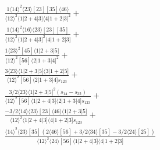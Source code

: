 \documentclass[varwidth, border=5pt]{standalone}
\begin{document}
\begin{my}
$\begin{gathered}
\scriptscriptstyle\frac{1⟨14⟩^2⟨23⟩[23][35]⟨46⟩}{⟨12⟩^2⟨1|2+4|3]⟨4|1+2|3]^2}+\\
\scriptscriptstyle\frac{1⟨14⟩^2⟨16⟩⟨23⟩[23][35]}{⟨12⟩^2⟨1|2+4|3]^2⟨4|1+2|3]}+\\
\scriptscriptstyle\frac{1⟨23⟩^2[45]⟨1|2+3|5]}{⟨12⟩^2[56]⟨2|1+3|4]^2}+\\
\scriptscriptstyle\frac{3⟨23⟩⟨1|2+3|5]⟨3|1+2|5]}{⟨12⟩^2[56]⟨2|1+3|4]s_{123}}+\\
\scriptscriptstyle\frac{3/2⟨23⟩⟨1|2+3|5]^2(s_{14}-s_{32})}{⟨12⟩^2[56]⟨1|2+4|3]⟨2|1+3|4]s_{123}}+\\
\scriptscriptstyle\frac{-3/2⟨14⟩⟨23⟩[23]⟨46⟩⟨1|2+3|5]}{⟨12⟩^2⟨1|2+4|3]⟨4|1+2|3]s_{123}}+\\
\scriptscriptstyle\frac{⟨14⟩^2⟨23⟩[35](2⟨46⟩[56]+3/2⟨34⟩[35]-3/2⟨24⟩[25])}{⟨12⟩^2⟨24⟩[56]⟨1|2+4|3]⟨4|1+2|3]}\phantom{+}
\end{gathered}$
\end{my}
\end{document}
